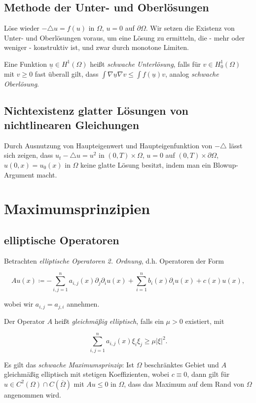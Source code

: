 \documentclass[11pt,a4paper]{scrartcl}
\newcommand{\laplace}{\triangle}
\theoremstyle{plain}
\theoremstyle{definition}
\theoremstyle{remark}
\begin{document}
\subsection{Methode der Unter- und Oberlösungen}

Löse wieder $-\laplace u = f(u)$ in $\Omega$, $u=0$ auf $\partial\Omega$. Wir setzen die Existenz von Unter- und Oberlösungen voraus, um eine Lösung zu ermitteln, die - mehr oder weniger - konstruktiv ist, und zwar durch monotone Limiten.

Eine Funktion $\underline{u}\in H^1(\Omega)$ heißt \emph{schwache Unterlösung}, falls für $v\in H^1_0(\Omega)$ mit $v\geq 0$ fast überall gilt, dass $\int \nabla \underline{u} \nabla v \leq \int f(\underline{u})v$, analog \emph{schwache Oberlösung}.

\subsection{Nichtexistenz glatter Lösungen von nichtlinearen Gleichungen}

Durch Ausnutzung von Haupteigenwert und Haupteigenfunktion von $-\laplace$ lässt sich zeigen, dass $u_t -\laplace u = u^2$ in $(0,T)\times \Omega$, $u=0$ auf $(0,T)\times \partial\Omega$, $u(0,x)=u_0(x)$ in $\Omega$ keine glatte Lösung besitzt, indem man ein Blowup-Argument macht.

\section{Maximumsprinzipien}

\subsection{elliptische Operatoren}

Betrachten \emph{elliptische Operatoren 2. Ordnung}, d.h. Operatoren der Form

$$Au(x)\coloneqq -\sum_{i,j=1}^n a_{i,j}(x)\partial_j \partial_i u(x) + \sum_{i=1}^n b_i(x) \partial_i u(x) +c(x) u(x),$$

wobei wir $a_{i,j}=a_{j,i}$ annehmen.

Der Operator $A$ heißt \emph{gleichmäßig elliptisch}, falls ein $\mu > 0$ existiert, mit

$$\sum_{i,j=1}^n a_{i,j}(x)\xi_i\xi_j \geq \mu |\xi|^2.$$

Es gilt das \emph{schwache Maximumsprinzip}: Ist $\Omega$ beschränktes Gebiet und $A$ gleichmäßig elliptisch mit stetigen Koeffizienten, wobei $c\equiv 0$, dann gilt für $u\in C^2(\Omega) \cap C(\overline{\Omega})$ mit $Au \leq 0$ in $\Omega$, dass das Maximum auf dem Rand von $\Omega$ angenommen wird.
\end{document}

